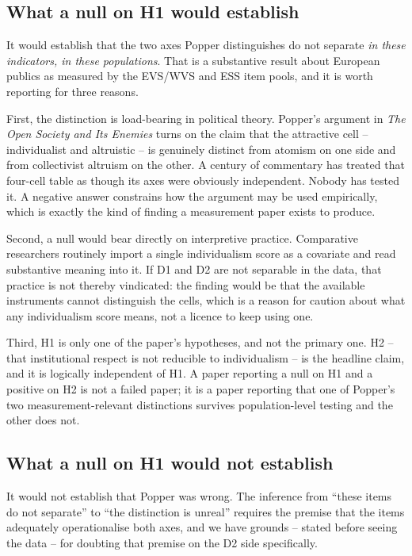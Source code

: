 \subsection{What a null on H1 would establish}

It would establish that the two axes Popper distinguishes do not separate
\emph{in these indicators, in these populations}. That is a substantive result
about European publics as measured by the EVS/WVS and ESS item pools, and it is
worth reporting for three reasons.

First, the distinction is load-bearing in political theory. Popper's argument
in \emph{The Open Society and Its Enemies} \citep{popper_ose} turns on the claim that the
attractive cell -- individualist and altruistic -- is genuinely distinct from
atomism on one side and from collectivist altruism on the other. A century of
commentary has treated that four-cell table as though its axes were obviously
independent. Nobody has tested it. A negative answer constrains how the
argument may be used empirically, which is exactly the kind of finding a
measurement paper exists to produce.

Second, a null would bear directly on interpretive practice. Comparative
researchers routinely import a single individualism score as a covariate and
read substantive meaning into it. If D1 and D2 are not separable in the data,
that practice is not thereby vindicated: the finding would be that the
available instruments cannot distinguish the cells, which is a reason for
caution about what any individualism score means, not a licence to keep using
one.

Third, H1 is only one of the paper's hypotheses, and not the primary one. H2 --
that institutional respect is not reducible to individualism -- is the headline
claim, and it is logically independent of H1. A paper reporting a null on H1
and a positive on H2 is not a failed paper; it is a paper reporting that one of
Popper's two measurement-relevant distinctions survives population-level
testing and the other does not.

\subsection{What a null on H1 would not establish}

It would not establish that Popper was wrong. The inference from ``these items
do not separate'' to ``the distinction is unreal'' requires the premise that
the items adequately operationalise both axes, and we have grounds -- stated
before seeing the data -- for doubting that premise on the D2 side
specifically.

